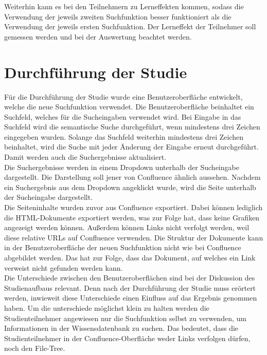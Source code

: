 Weiterhin kann es bei den Teilnehmern zu Lerneffekten kommen, sodass die Verwendung der jeweils zweiten Suchfunktion besser funktioniert als die Verwendung der jeweils ersten Suchfunktion.
Der Lerneffekt der Teilnehmer soll gemessen werden und bei der Auswertung beachtet werden.

\section{Durchführung der Studie}
Für die Durchführung der Studie wurde eine Benutzeroberfläche entwickelt, welche die neue Suchfunktion verwendet.
Die Benutzeroberfläche beinhaltet ein Suchfeld, welches für die Sucheingaben verwendet wird.
Bei Eingabe in das Suchfeld wird die semantische Suche durchgeführt, wenn mindestens drei Zeichen eingegeben wurden.
Solange das Suchfeld weiterhin mindestens drei Zeichen beinhaltet, wird die Suche mit jeder Änderung der Eingabe erneut durchgeführt.
Damit werden auch die Suchergebnisse aktualisiert.\\

Die Suchergebnisse werden in einem Dropdown unterhalb der Sucheingabe dargestellt.
Die Darstellung soll jener von Confluence ähnlich aussehen.
Nachdem ein Suchergebnis aus dem Dropdown angeklickt wurde, wird die Seite unterhalb der Sucheingabe dargestellt.\\

Die Seiteninhalte wurden zuvor aus Confluence exportiert.
Dabei können lediglich die HTML-Dokumente exportiert werden, was zur Folge hat, dass keine Grafiken angezeigt werden können.
Außerdem können Links nicht verfolgt werden, weil diese relative URLs auf Confluence verwenden.
Die Struktur der Dokumente kann in der Benutzeroberfläche der neuen Suchfunktion nicht wie bei Confluence abgebildet werden.
Das hat zur Folge, dass das Dokument, auf welches ein Link verweist nicht gefunden werden kann.\\

Die Unterschiede zwischen den Benutzeroberflächen sind bei der Diskussion des Studienaufbaus relevant.
Denn nach der Durchführung der Studie muss erörtert werden, inwieweit diese Unterschiede einen Einfluss auf das Ergebnis genommen haben.
Um die unterschiede möglichst klein zu halten werden die Studienteilnehmer angewiesen nur die Suchfunktion selbst zu verwenden, um Informationen in der Wissensdatenbank zu suchen.
Das bedeutet, dass die Studienteilnehmer in der Confluence-Oberfläche weder Links verfolgen dürfen, noch den File-Tree.\\

